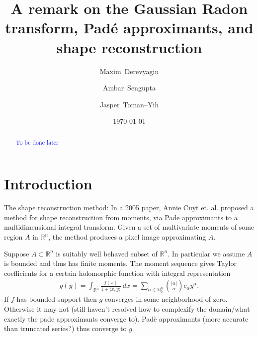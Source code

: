 \documentclass{amsart}
\theoremstyle{remark}
\numberwithin{equation}{section}
\newcommand{\tc}{\textcolor{blue}}
\newcommand{\RR}{\mathbb{R}}
\newcommand{\NN}{\mathbb{N}}
\begin{document}
\title{A remark on the Gaussian Radon transform, Pad\'e approximants, and shape reconstruction}


\date{\today}

\author[M.~Derevyagin]{Maxim~Derevyagin}
\address{
MD,
Department of Mathematics\\
University of Connecticut\\
341 Mansfield Road, U-1009\\
Storrs, CT 06269–1009, USA}

\author[A.~Sengupta]{Ambar~Sengupta}
\address{
AS,
Department of Mathematics\\
University of Connecticut\\
341 Mansfield Road, U–1009\\
Storrs, CT 0626–91009, USA}

\author[J.~Toman–Yih]{Jasper~Toman–Yih}
\address{
JT,
Department of Mathematics\\
University of Connecticut\\
341 Mansfield Road, U–1009\\
Storrs, CT 06269–1009, USA}


\begin{abstract}
\tc{To be done later}
\end{abstract}

\maketitle

\section{Introduction}

The shape reconstruction method: In a 2005 paper, Annie Cuyt et. al. \cite{Cuyt05} proposed a method for shape reconstruction from moments, via Pade approximants to a multidimensional integral transform. Given a set of multivariate moments of some region $A$ in $\RR^n$, the method produces a pixel image approximating $A$. 

Suppose $A \subset \RR^n$ is suitably well behaved subset of $\RR^n$. In particular we assume $A$ is bounded and thus has finite moments. The moment sequence gives Taylor coefficients for a certain holomorphic function with integral representation
\begin{align*}
    g(y) = \int_{\RR^n} \frac{f(x)}{1 + \langle x, y\rangle} ~dx = \sum_{\alpha \in \NN_0^n} \binom{|\alpha|}{\alpha} c_\alpha y^\alpha.
\end{align*}
If $f$ has bounded support then $g$ converges in some neighborhood of zero. Otherwise it may not (still haven't resolved how to complexify the domain/what exactly the pade approximants converge to). Pad\`e approximants (more accurate than truncated series?) thus converge to $g$.
\end{document}
